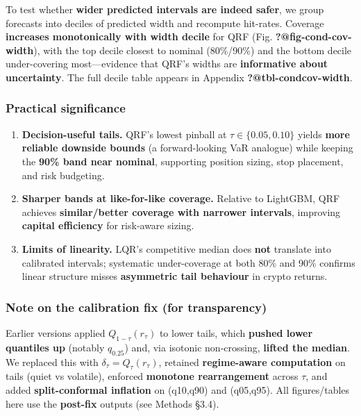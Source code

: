 \documentclass[
  a4paper,
  DIV=11,
  numbers=noendperiod]{scrreprt}
\providecommand{\tightlist}{%
  \setlength{\itemsep}{0pt}\setlength{\parskip}{0pt}}
\begin{document}
To test whether \textbf{wider predicted intervals are indeed safer}, we
group forecasts into deciles of predicted width and recompute hit-rates.
Coverage \textbf{increases monotonically with width decile} for QRF
(Fig. \textbf{?@fig-cond-cov-width}), with the top decile closest to
nominal (80\%/90\%) and the bottom decile under-covering most---evidence
that QRF's widths are \textbf{informative about uncertainty}. The full
decile table appears in Appendix \textbf{?@tbl-condcov-width}.

\subsubsection{Practical significance}\label{practical-significance}

\begin{enumerate}
\def\labelenumi{\arabic{enumi}.}
\tightlist
\item
  \textbf{Decision-useful tails.} QRF's lowest pinball at
  \(\tau\in\{0.05,0.10\}\) yields \textbf{more reliable downside bounds}
  (a forward-looking VaR analogue) while keeping the \textbf{90\% band
  near nominal}, supporting position sizing, stop placement, and risk
  budgeting.
\item
  \textbf{Sharper bands at like-for-like coverage.} Relative to
  LightGBM, QRF achieves \textbf{similar/better coverage with narrower
  intervals}, improving \textbf{capital efficiency} for risk-aware
  sizing.
\item
  \textbf{Limits of linearity.} LQR's competitive median does
  \textbf{not} translate into calibrated intervals; systematic
  under-coverage at both 80\% and 90\% confirms linear structure misses
  \textbf{asymmetric tail behaviour} in crypto returns.
\end{enumerate}

\subsubsection{Note on the calibration fix (for
transparency)}\label{note-on-the-calibration-fix-for-transparency}

Earlier versions applied \(Q_{1-\tau}(r_\tau)\) to lower tails, which
\textbf{pushed lower quantiles up} (notably \(q_{0.25}\)) and, via
isotonic non-crossing, \textbf{lifted the median}. We replaced this with
\(\delta_\tau = Q_\tau(r_\tau)\), retained \textbf{regime-aware
computation} on tails (quiet vs volatile), enforced \textbf{monotone
rearrangement} across \(\tau\), and added \textbf{split-conformal
inflation} on (q10,q90) and (q05,q95). All figures/tables here use the
\textbf{post-fix} outputs (see Methods §3.4).
\end{document}
